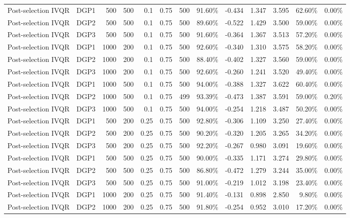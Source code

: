 \begin{landscape}
\begin{longtable}{llrrrrrrrrrrr}
Post-selection IVQR & DGP1 & 500 & 500 & 0.1 & 0.75 & 500 & 91.60\% & -0.434 & 1.347 & 3.595 & 62.60\% & 0.00\% \\
Post-selection IVQR & DGP2 & 500 & 500 & 0.1 & 0.75 & 500 & 89.60\% & -0.522 & 1.429 & 3.500 & 59.00\% & 0.00\% \\
Post-selection IVQR & DGP3 & 500 & 500 & 0.1 & 0.75 & 500 & 91.60\% & -0.364 & 1.367 & 3.513 & 57.20\% & 0.00\% \\
Post-selection IVQR & DGP1 & 1000 & 200 & 0.1 & 0.75 & 500 & 92.60\% & -0.340 & 1.310 & 3.575 & 58.20\% & 0.00\% \\
Post-selection IVQR & DGP2 & 1000 & 200 & 0.1 & 0.75 & 500 & 88.40\% & -0.402 & 1.327 & 3.560 & 59.00\% & 0.00\% \\
Post-selection IVQR & DGP3 & 1000 & 200 & 0.1 & 0.75 & 500 & 92.60\% & -0.260 & 1.241 & 3.520 & 49.40\% & 0.00\% \\
Post-selection IVQR & DGP1 & 1000 & 500 & 0.1 & 0.75 & 500 & 94.00\% & -0.388 & 1.327 & 3.622 & 60.40\% & 0.00\% \\
Post-selection IVQR & DGP2 & 1000 & 500 & 0.1 & 0.75 & 499 & 93.39\% & -0.473 & 1.387 & 3.591 & 59.00\% & 0.20\% \\
Post-selection IVQR & DGP3 & 1000 & 500 & 0.1 & 0.75 & 500 & 94.00\% & -0.254 & 1.218 & 3.487 & 50.20\% & 0.00\% \\
Post-selection IVQR & DGP1 & 500 & 200 & 0.25 & 0.75 & 500 & 92.80\% & -0.306 & 1.109 & 3.250 & 27.40\% & 0.00\% \\
Post-selection IVQR & DGP2 & 500 & 200 & 0.25 & 0.75 & 500 & 90.20\% & -0.320 & 1.205 & 3.265 & 34.20\% & 0.00\% \\
Post-selection IVQR & DGP3 & 500 & 200 & 0.25 & 0.75 & 500 & 92.20\% & -0.267 & 0.980 & 3.091 & 19.60\% & 0.00\% \\
Post-selection IVQR & DGP1 & 500 & 500 & 0.25 & 0.75 & 500 & 90.00\% & -0.335 & 1.171 & 3.274 & 29.80\% & 0.00\% \\
Post-selection IVQR & DGP2 & 500 & 500 & 0.25 & 0.75 & 500 & 86.80\% & -0.472 & 1.279 & 3.244 & 35.00\% & 0.00\% \\
Post-selection IVQR & DGP3 & 500 & 500 & 0.25 & 0.75 & 500 & 91.00\% & -0.219 & 1.012 & 3.198 & 23.40\% & 0.00\% \\
Post-selection IVQR & DGP1 & 1000 & 200 & 0.25 & 0.75 & 500 & 91.40\% & -0.131 & 0.898 & 2.850 & 9.80\% & 0.00\% \\
Post-selection IVQR & DGP2 & 1000 & 200 & 0.25 & 0.75 & 500 & 91.80\% & -0.254 & 0.952 & 3.010 & 17.20\% & 0.00\% \\

\end{longtable}
\end{landscape}

